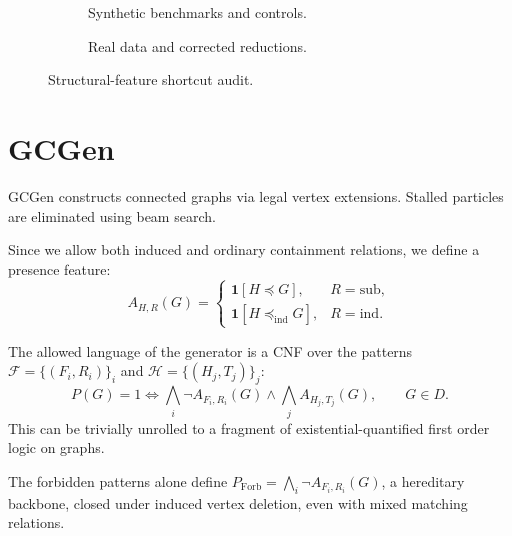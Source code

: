 \documentclass[11pt,twocolumn]{article}
\newcommand{\subg}{\preccurlyeq}
\newcommand{\subgind}{\preccurlyeq_{\mathrm{ind}}}
\newcommand{\Forb}{\operatorname{Forb}}
\newcommand{\gen}{GCGen\xspace}
\begin{document}
\cite{faberWhenComparingGround2021}


\begin{figure}[t]
	\centering
	\begin{subfigure}[t]{0.49\textwidth}
		\centering
		\resizebox{\linewidth}{!}{}
		\caption{Synthetic benchmarks and controls.}\label{fig:syn}
	\end{subfigure}\hfill
	\begin{subfigure}[t]{0.49\textwidth}
		\centering
		\resizebox{\linewidth}{!}{}
		\caption{Real data and corrected reductions.}\label{fig:real}
	\end{subfigure}
	\caption{Structural-feature shortcut audit.}\label{fig:shortcuts}
\end{figure}



\section{\gen}\label{sec:generator}

\gen constructs connected graphs via legal vertex extensions. Stalled particles are eliminated using beam search.


Since we allow both induced and ordinary containment relations, we define a presence feature:
$$
A_{H,R}(G)=
\begin{cases}
	\mathbf 1[H\subg G],&R=\mathrm{sub},\\
	\mathbf 1[H\subgind G],&R=\mathrm{ind}.
\end{cases}
$$

The allowed language of the generator is a CNF over the patterns $\mathcal{F} =\{(F_i,R_i)\}_i$ and $\mathcal{H}=\{(H_j,T_j)\}_j$:
$$
P(G)=1 \iff \bigwedge_i\neg A_{F_i,R_i}(G) \land \bigwedge_j A_{H_j,T_j}(G), \qquad G\in D.
$$
This can be trivially unrolled to a fragment of existential-quantified first order logic on graphs.

The forbidden patterns alone define $P_{\Forb}=\bigwedge_i\neg A_{F_i,R_i}(G)$, a hereditary backbone, closed under induced vertex deletion, even with mixed matching relations.  %

\end{document}
